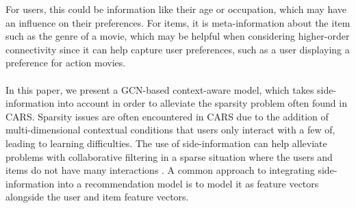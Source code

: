 For users, this could be information like their age or occupation, which may have an influence on their preferences.
For items, it is meta-information about the item such as the genre of a movie, which may be helpful when considering higher-order connectivity since it can help capture user preferences, such as a user displaying a preference for action movies.
\\\\
In this paper, we present a GCN-based context-aware model, which takes side-information into account in order to alleviate the sparsity problem often found in CARS.
Sparsity issues are often encountered in CARS due to the addition of multi-dimensional contextual conditions that users only interact with a few of\cite{SparsityCARS}, leading to learning difficulties.
The use of side-information can help alleviate problems with collaborative filtering in a sparse situation where the users and items do not have many interactions \cite{KGAT}. 
A common approach to integrating side-information into a recommendation model is to model it as feature vectors alongside the user and item feature vectors.

